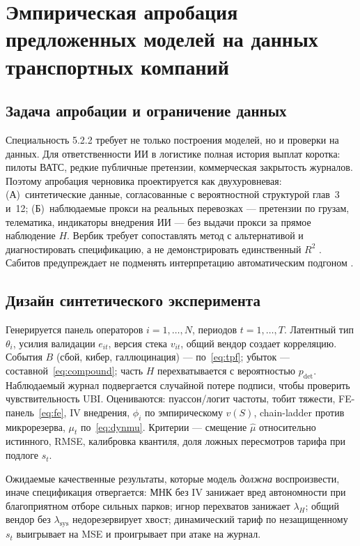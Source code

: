 \documentclass[a4paper,14pt]{extarticle}
\begin{document}
\section{Эмпирическая апробация предложенных моделей на данных транспортных компаний}

\subsection{Задача апробации и ограничение данных}

Специальность 5.2.2 требует не только построения моделей, но и проверки на данных. Для ответственности ИИ в логистике полная история выплат коротка: пилоты ВАТС, редкие публичные претензии, коммерческая закрытость журналов. Поэтому апробация черновика проектируется как двухуровневая: (А)~синтетические данные, согласованные с вероятностной структурой глав~3 и~12; (Б)~наблюдаемые прокси на реальных перевозках --- претензии по грузам, телематика, индикаторы внедрения ИИ --- без выдачи прокси за прямое наблюдение $H$. Вербик требует сопоставлять метод с альтернативой и диагностировать спецификацию, а не демонстрировать единственный $R^2$ \cite{verbeek}. Сабитов предупреждает не подменять интерпретацию автоматическим подгоном \cite{sabitov}.

\subsection{Дизайн синтетического эксперимента}

Генерируется панель операторов $i=1,\ldots,N$, периодов $t=1,\ldots,T$. Латентный тип $\theta_i$, усилия валидации $e_{it}$, версия стека $v_{it}$, общий вендор создает корреляцию. События $B$ (сбой, кибер, галлюцинация) --- по~\eqref{eq:tpf}; убыток --- составной~\eqref{eq:compound}; часть $H$ перехватывается с вероятностью $p_{\mathrm{det}}$. Наблюдаемый журнал подвергается случайной потере подписи, чтобы проверить чувствительность UBI. Оцениваются: пуассон/логит частоты, тобит тяжести, FE-панель~\eqref{eq:fe}, IV внедрения, $\phi_i$ по эмпирическому $v(S)$, chain-ladder против микрорезерва, $\mu_t$ по~\eqref{eq:dynmu}. Критерии --- смещение $\hat\mu$ относительно истинного, RMSE, калибровка квантиля, доля ложных пересмотров тарифа при подлоге $s_t$.

Ожидаемые качественные результаты, которые модель \emph{должна} воспроизвести, иначе спецификация отвергается: МНК без IV занижает вред автономности при благоприятном отборе сильных парков; игнор перехватов занижает $\lambda_H$; общий вендор без $\lambda_{\mathrm{sys}}$ недорезервирует хвост; динамический тариф по незащищенному $s_t$ выигрывает на MSE и проигрывает при атаке на журнал.
\end{document}

